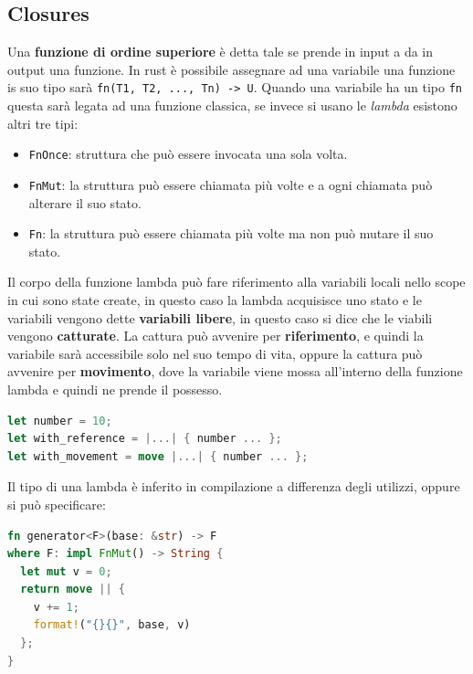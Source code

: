 \documentclass[12pt]{article}
\begin{document}
\subsection{Closures}
Una \textbf{funzione di ordine superiore} \`e detta tale se prende in input a da in output una funzione. In rust \`e possibile assegnare ad una variabile una funzione is suo tipo sar\`a \texttt{fn(T1, T2, ..., Tn) -> U}. Quando una variabile ha un tipo \texttt{fn} questa sar\`a legata ad una funzione classica, se invece si usano le \emph{lambda} esistono altri tre tipi:
\begin{itemize}
  \item \texttt{FnOnce}: struttura che pu\`o essere invocata una sola volta.
  \item \texttt{FnMut}: la struttura pu\`o essere chiamata pi\`u volte e a ogni chiamata pu\`o alterare il suo stato.
  \item \texttt{Fn}: la struttura pu\`o essere chiamata pi\`u volte ma non pu\`o mutare il suo stato.
\end{itemize}
Il corpo della funzione lambda pu\`o fare riferimento alla variabili locali nello scope in cui sono state create, in questo caso la lambda acquisisce uno stato e le variabili vengono dette \textbf{variabili libere}, in questo caso si dice che le viabili vengono \textbf{catturate}. La cattura pu\`o avvenire per \textbf{riferimento}, e quindi la variabile sar\`a accessibile solo nel suo tempo di vita, oppure la cattura pu\`o avvenire per \textbf{movimento}, dove la variabile viene mossa all'interno della funzione lambda e quindi ne prende il possesso.
\begin{lstlisting}[language=rust]
let number = 10;
let with_reference = |...| { number ... };
let with_movement = move |...| { number ... };
\end{lstlisting}
Il tipo di una lambda \`e inferito in compilazione a differenza degli utilizzi, oppure si pu\`o specificare:
\begin{lstlisting}[language=rust]
fn generator<F>(base: &str) -> F
where F: impl FnMut() -> String {
  let mut v = 0;
  return move || {
    v += 1;
    format!("{}{}", base, v)
  };
}
\end{lstlisting}
\end{document}
